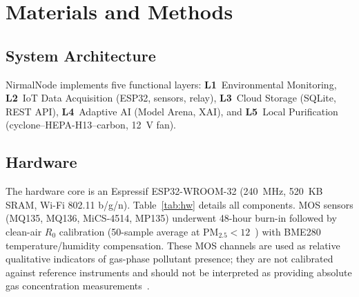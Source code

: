 
\section{Materials and Methods}
\label{sec:method}

\subsection{System Architecture}
NirmalNode implements five functional layers: \textbf{L1}~Environmental Monitoring,
\textbf{L2}~IoT Data Acquisition (ESP32, sensors, relay), \textbf{L3}~Cloud Storage
(SQLite, REST API), \textbf{L4}~Adaptive AI (Model Arena, XAI), and
\textbf{L5}~Local Purification (cyclone--HEPA-H13--carbon, 12~V fan).

\subsection{Hardware}
\label{sec:hw}

The hardware core is an Espressif ESP32-WROOM-32 (240~MHz, 520~KB SRAM, Wi-Fi 802.11
b/g/n). Table~\ref{tab:hw} details all components. MOS sensors (MQ135, MQ136,
MiCS-4514, MP135) underwent 48-hour burn-in followed by clean-air $R_0$ calibration
(50-sample average at PM$_{2.5}<12$~\ugsm) with BME280 temperature/humidity compensation.
These MOS channels are used as relative qualitative indicators of gas-phase pollutant
presence; they are not calibrated against reference instruments and should not be
interpreted as providing absolute gas concentration measurements~\citep{lowcostpm2025acs,
mos2024trac}.

